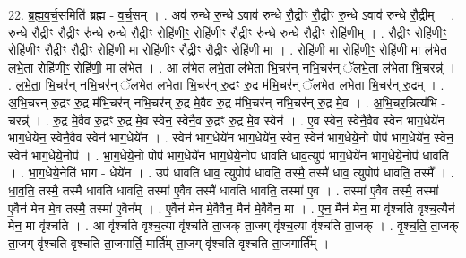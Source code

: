 \documentclass[17pt]{extarticle}
\begin{document}
22. ब्र॒ह्म॒व॒र्च॒समिति॑ ब्रह्म - व॒र्च॒सम् । . अव॑ रुन्धे रु॒न्धे ऽवाव॑ रुन्धे रौ॒द्रीꣳ रौ॒द्रीꣳ रु॒न्धे ऽवाव॑ रुन्धे रौ॒द्रीम् । . रु॒न्धे॒ रौ॒द्रीꣳ रौ॒द्रीꣳ रु॑न्धे रुन्धे रौ॒द्रीꣳ रोहि॑णीꣳ॒॒ रोहि॑णीꣳ रौ॒द्रीꣳ रु॑न्धे रुन्धे रौ॒द्रीꣳ रोहि॑णीम् । . रौ॒द्रीꣳ रोहि॑णीꣳ॒॒ रोहि॑णीꣳ रौ॒द्रीꣳ रौ॒द्रीꣳ रोहि॑णी॒ मा रोहि॑णीꣳ रौ॒द्रीꣳ रौ॒द्रीꣳ रोहि॑णी॒ मा । . रोहि॑णी॒ मा रोहि॑णीꣳ॒॒ रोहि॑णी॒ मा ल॑भेत लभे॒ता रोहि॑णीꣳ॒॒ रोहि॑णी॒ मा ल॑भेत । . आ ल॑भेत लभे॒ता ल॑भेता भि॒चर॑न् नभि॒चर॑न् ॅलभे॒ता ल॑भेता भि॒चरन्न्॑ । . ल॒भे॒ता॒ भि॒चर॑न् नभि॒चर॑न् ॅलभेत लभेता भि॒चर॑न् रु॒द्रꣳ रु॒द्र म॑भि॒चर॑न् ॅलभेत लभेता भि॒चर॑न् रु॒द्रम् । . अ॒भि॒चर॑न् रु॒द्रꣳ रु॒द्र म॑भि॒चर॑न् नभि॒चर॑न् रु॒द्र मे॒वैव रु॒द्र म॑भि॒चर॑न् नभि॒चर॑न् रु॒द्र मे॒व । . अ॒भि॒चर॒न्नित्य॑भि - चरन्न्॑ । . रु॒द्र मे॒वैव रु॒द्रꣳ रु॒द्र मे॒व स्वेन॒ स्वेनै॒व रु॒द्रꣳ रु॒द्र मे॒व स्वेन॑ । . ए॒व स्वेन॒ स्वेनै॒वैव स्वेन॑ भाग॒धेये॑न भाग॒धेये॑न॒ स्वेनै॒वैव स्वेन॑ भाग॒धेये॑न । . स्वेन॑ भाग॒धेये॑न भाग॒धेये॑न॒ स्वेन॒ स्वेन॑ भाग॒धेये॒नो पोप॑ भाग॒धेये॑न॒ स्वेन॒ स्वेन॑ भाग॒धेये॒नोप॑ । . भा॒ग॒धेये॒नो पोप॑ भाग॒धेये॑न भाग॒धेये॒नोप॑ धावति धाव॒त्युप॑ भाग॒धेये॑न भाग॒धेये॒नोप॑ धावति । . भा॒ग॒धेये॒नेति॑ भाग - धेये॑न । . उप॑ धावति धाव॒ त्युपोप॑ धावति॒ तस्मै॒ तस्मै॑ धाव॒ त्युपोप॑ धावति॒ तस्मै᳚ । . धा॒व॒ति॒ तस्मै॒ तस्मै॑ धावति धावति॒ तस्मा॑ ए॒वैव तस्मै॑ धावति धावति॒ तस्मा॑ ए॒व । . तस्मा॑ ए॒वैव तस्मै॒ तस्मा॑ ए॒वैन॑ मेन मे॒व तस्मै॒ तस्मा॑ ए॒वैन᳚म् । . ए॒वैन॑ मेन मे॒वैवैन॒ मैन॑ मे॒वैवैन॒ मा । . ए॒न॒ मैन॑ मेन॒ मा वृ॑श्चति वृश्च॒त्यैन॑ मेन॒ मा वृ॑श्चति । . आ वृ॑श्चति वृश्च॒त्या वृ॑श्चति ता॒जक् ता॒जग् वृ॑श्च॒त्या वृ॑श्चति ता॒जक् । . वृ॒श्च॒ति॒ ता॒जक् ता॒जग् वृ॑श्चति वृश्चति ता॒जगार्ति॒ मार्ति॑म् ता॒जग् वृ॑श्चति वृश्चति ता॒जगार्ति᳚म् । \newline
\end{document}
